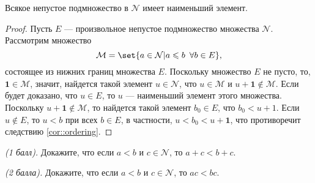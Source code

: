 \documentclass{article}
\begin{document}
\begin{theorem}
    \label{th::well-ordering}
    Всякое непустое подмножество в \( \mathcal{N} \) имеет наименьший элемент.    
\end{theorem}
\begin{proof}
    Пусть \( E \) — произвольное непустое подмножество множества \( \mathcal{N} \). Рассмотрим множество 
    \[ 
        \mathcal{M} = \set{ a \in \mathcal{N} | a \leq b \,\  \forall b \in E },
    \] 
    состоящее из нижних границ множества \( E \). Поскольку множество \( E \) не пусто, то, \( \mathbf{1} \in \mathcal{M} \), значит, найдется такой элемент \(u \in \mathcal{N} \), что \( u \in \mathcal{M} \) и \( u + \mathbf{1}  \notin \mathcal{M} \). Если будет доказано, что \( u \in E \), то \( u \) --- наименьший элемент этого множества. Поскольку \( u + \mathbf{1}  \notin \mathcal{M} \), то найдется такой элемент \( b_0 \in E \), что \( b_0 < u + 1 \). Если \( u \notin E \), то \( u < b \) при всех \( b \in E \), в частности, \( u < b_0 < u + \mathbf{1}\), что противоречит следствию \ref{cor::ordering}. 
\end{proof}

\begin{?}
    \textit{(1 балл).} Докажите, что если \( a < b \) и \( c \in \mathcal{N} \), то \( a + c < b + c \).
\end{?}
\begin{?}
    \textit{(2 балла).} Докажите, что если \( a < b \) и \( c \in \mathcal{N} \), то \( a c < b c \).
\end{?}
\end{document}
